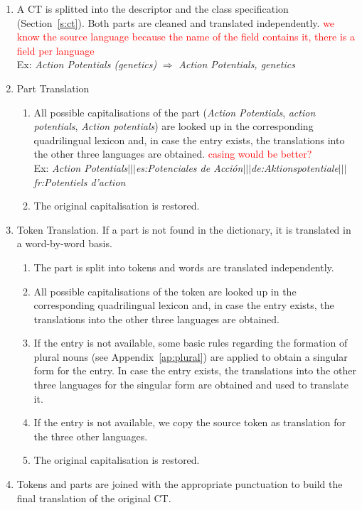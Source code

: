 \documentclass[a4paper,11pt]{article}
\newcommand{\red}[1]{\textcolor{red}{#1}}
\begin{document}
\begin{enumerate}
 \item A CT is splitted into the descriptor and the class specification (Section~\ref{s:ct}). Both parts are cleaned and translated independently. \red{we know the source language because the name of the field contains it, there is a field per language}\\ 
       Ex: \emph{Action Potentials (genetics)} $\Rightarrow$ \emph{Action Potentials, genetics}
 \item Part Translation
      \begin{enumerate}[label*=\arabic*.]
      \item  All possible capitalisations of the part (\emph{Action Potentials}, \emph{action potentials}, \emph{Action potentials}) are looked up in the corresponding quadrilingual lexicon and, in case the entry exists, the translations into the other three languages are obtained. \red{casing would be better?}\\ 
       Ex: \emph{Action Potentials$|||$es:Potenciales de Acción$|||$de:Aktionspotentiale$|||$fr:Potentiels d'action}
      \item The original capitalisation is restored.
      \end{enumerate}

 \item Token Translation. If a part is not found in the dictionary, it is translated in a word-by-word basis.
      \begin{enumerate}[label*=\arabic*.]
	\item The part is split into tokens and words are translated independently.  
	\item  All possible capitalisations of the token are looked up in the corresponding quadrilingual lexicon and, in case the entry exists, the translations into the other three languages are obtained.
	\item If the entry is not available, some basic rules regarding the formation of plural nouns (see Appendix~\ref{ap:plural}) are applied to obtain a singular form for the entry. In case the entry exists, the translations into the other three languages for the singular form are obtained and used to translate it.
	\item If the entry is not available, we copy the source token as translation for the three other languages.
	\item The original capitalisation is restored.
      \end{enumerate}
     
  \item Tokens and parts are joined with the appropriate punctuation to build the final translation of the original CT.
     
\end{enumerate}
\end{document}
